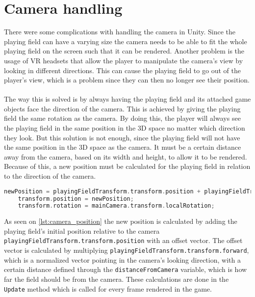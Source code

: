 \section{Camera handling}
There were some complications with handling the camera in Unity.
Since the playing field can have a varying size the camera needs to be able to fit the whole playing field on the screen such that it can be rendered.
Another problem is the usage of VR headsets that allow the player to manipulate the camera's view by looking in different directions.
This can cause the playing field to go out of the player's view, which is a problem since they can then no longer see their position.
\\\\
The way this is solved is by always having the playing field and its attached game objects face the direction of the camera.
This is achieved by giving the playing field the same rotation as the camera.
By doing this, the player will always see the playing field in the same position in the 3D space no matter which direction they look.
But this solution is not enough, since the playing field will not have the same position in the 3D space as the camera.
It must be a certain distance away from the camera, based on its width and height, to allow it to be rendered. 
Because of this, a new position must be calculated for the playing field in relation to the direction of the camera. 
\begin{lstlisting}[caption={Calculating and setting the position and rotation of the playing field}, captionpos=b,language=C,label={lst:camera_position}]
    newPosition = playingFieldTransform.transform.position + playingFieldTransform.transform.forward * distanceFromCamera;
    transform.position = newPosition;
    transform.rotation = mainCamera.transform.localRotation; 
\end{lstlisting}
As seen on \autoref{lst:camera_position} the new position is calculated by adding the playing field's initial position relative to the camera \texttt{playingFieldTransform.transform.position} with an offset vector.
The offset vector is calculated by multiplying \texttt{playingFieldTransform.transform.forward}, which is a normalized vector pointing in the camera's looking direction, with a certain distance defined through the \texttt{distanceFromCamera} variable, which is how far the field should be from the camera.
These calculations are done in the \texttt{Update} method which is called for every frame rendered in the game.
\\\\
